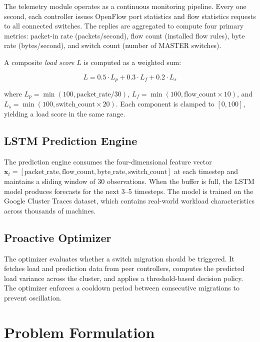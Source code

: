 \documentclass[12pt,a4paper]{report}
\begin{document}
The telemetry module operates as a continuous monitoring pipeline. Every one second, each controller issues OpenFlow port statistics and flow statistics requests to all connected switches. The replies are aggregated to compute four primary metrics: packet-in rate (packets/second), flow count (installed flow rules), byte rate (bytes/second), and switch count (number of MASTER switches).

A composite \textit{load score} $L$ is computed as a weighted sum:

\begin{equation}
L = 0.5 \cdot L_p + 0.3 \cdot L_f + 0.2 \cdot L_s
\label{eq:load_score}
\end{equation}

\noindent where $L_p = \min(100, \text{packet\_rate}/30)$, $L_f = \min(100, \text{flow\_count} \times 10)$, and $L_s = \min(100, \text{switch\_count} \times 20)$. Each component is clamped to $[0, 100]$, yielding a load score in the same range.

\subsection{LSTM Prediction Engine}

The prediction engine consumes the four-dimensional feature vector $\mathbf{x}_t = [\text{packet\_rate}, \text{flow\_count}, \text{byte\_rate}, \text{switch\_count}]$ at each timestep and maintains a sliding window of 30 observations. When the buffer is full, the LSTM model produces forecasts for the next 3--5 timesteps. The model is trained on the Google Cluster Traces dataset, which contains real-world workload characteristics across thousands of machines.

\subsection{Proactive Optimizer}

The optimizer evaluates whether a switch migration should be triggered. It fetches load and prediction data from peer controllers, computes the predicted load variance across the cluster, and applies a threshold-based decision policy. The optimizer enforces a cooldown period between consecutive migrations to prevent oscillation.

\section{Problem Formulation}
\end{document}
